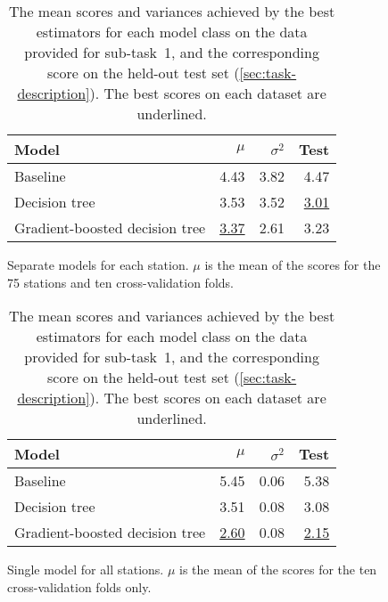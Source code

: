 \documentclass[11pt]{extarticle}
\newcommand{\subfigurespace}{\par\bigskip\bigskip}
\begin{document}
\begin{table}
  \centering
  \begin{subfigure}{\textwidth}
    \centering
    \begin{tabular}{lrrr}
      \toprule
      Model                          & $\mu$            & $\sigma^2$ & Test
      \\
      \midrule
      Baseline                       & 4.43             & 3.82       & 4.47
      \\
      Decision tree                  & 3.53             & 3.52       & \underline{3.01}
      \\
      Gradient-boosted decision tree & \underline{3.37} & 2.61       & 3.23
      \\
      \bottomrule
    \end{tabular}
    \caption{Separate models for each station. $\mu$ is the mean of the scores for the 75 stations
      and ten cross-validation folds.}
    \label{tab:subtask-1:results-1}
  \end{subfigure}
  \subfigurespace
  \begin{subfigure}{\textwidth}
    \centering
    \begin{tabular}{lrrr}
      \toprule
      Model                          & $\mu$            & $\sigma^2$ & Test
      \\
      \midrule
      Baseline                       & 5.45             & 0.06       & 5.38
      \\
      Decision tree                  & 3.51             & 0.08       & 3.08
      \\
      Gradient-boosted decision tree & \underline{2.60} & 0.08       & \underline{2.15}
      \\
      \bottomrule
    \end{tabular}
    \caption{Single model for all stations. $\mu$ is the mean of the scores for the ten
      cross-validation folds only.}
    \label{tab:subtask-1:results-2}
  \end{subfigure}
  \caption{The mean scores and variances achieved by the best estimators for each model
    class on the data provided for sub-task~1, and the corresponding score on the
    held-out test set (\cref{sec:task-description}).
    The best scores on each dataset are underlined.
  }
  \label{tab:subtask-1:results}
\end{table}
\end{document}
